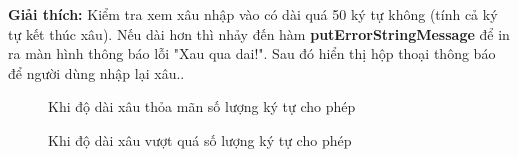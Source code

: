\documentclass[a4paper,12pt]{article}
\begin{document}
\noindent
\textbf{Giải thích: } 
Kiểm tra xem xâu nhập vào có dài quá 50 ký tự không (tính cả ký tự kết thúc xâu). Nếu dài hơn thì nhảy đến hàm \textbf{putErrorStringMessage} để in ra màn hình thông báo lỗi "Xau qua dai!". Sau đó hiển thị hộp thoại thông báo để người dùng nhập lại xâu..
\begin{figure}[!h]
	\centerline{}
	\caption{Khi độ dài xâu thỏa mãn số lượng ký tự cho phép}
	\label{fig:bai1}
\end{figure}
\begin{figure}[!h]
	\centerline{}
	\caption{Khi độ dài xâu vượt quá số lượng ký tự cho phép}
	\label{fig:bai1}
\end{figure}
\clearpage
\end{document}
